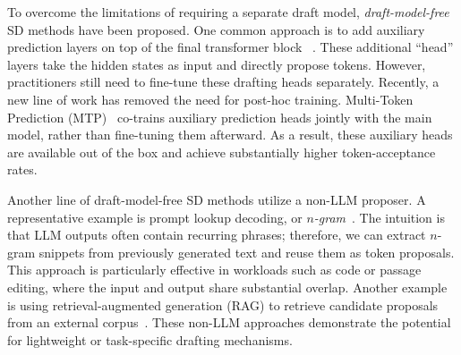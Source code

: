 \documentclass{article}
\newcommand{\alvin}[1]{\textcolor{red}{alvin: #1}}
\begin{document}
To overcome the limitations of requiring a separate draft model, \emph{draft-model-free} SD methods have been proposed.
One common approach is to add auxiliary prediction layers on top of the final transformer block ~\cite{li2024eagle, li2024eagle2fasterinferencelanguage, li2025eagle3}.
These additional ``head'' layers take the hidden states as input and directly propose tokens.
However, practitioners still need to fine-tune these drafting heads separately.
Recently, a new line of work has removed the need for post-hoc training. Multi-Token Prediction (MTP)~\cite{deepseekai2025deepseekv3technicalreport,5team2025glm45agenticreasoningcoding} co-trains auxiliary prediction heads jointly with the main model, rather than fine-tuning them afterward. As a result, these auxiliary heads are available out of the box and achieve substantially higher token-acceptance rates.

Another line of draft-model-free SD methods utilize a non-LLM proposer.
A representative example is prompt lookup decoding, or \emph{$n$-gram}~\cite{saxena2023prompt}.
The intuition is that LLM outputs often contain recurring phrases; therefore, we can extract $n$-gram snippets from previously generated text and reuse them as token proposals.
This approach is particularly effective in workloads such as code or passage editing, where the input and output share substantial overlap. 
Another example is using retrieval-augmented generation (RAG) to retrieve candidate proposals from an external corpus~\cite{he2024restretrievalbasedspeculativedecoding}.
These non-LLM approaches demonstrate the potential for lightweight or task-specific drafting mechanisms.
\end{document}
